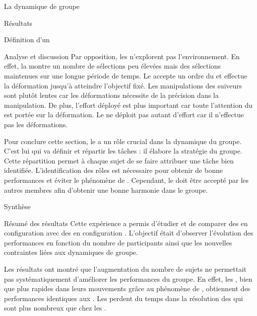 \documentclass[myfrancais,ngerman,english,frenchb]{mythesis}
\begin{document}
\begin{mychapter}{La dynamique de groupe}
\begin{mysection}{Résultats}
\begin{mysubsection}{Définition d'un }
\begin{mysubsubsection}{Analyse et discussion}
					Par opposition, les  n'explorent pas l'environnement.
					En effet, la  montre un nombre de sélections peu élevées mais des sélections maintenues sur une longue période de temps.
					Le  accepte un ordre du  et effectue la déformation jusqu'à atteindre l'objectif fixé.
					Les manipulations des suiveurs sont plutôt lentes car les déformations nécessite de la précision dans la manipulation.
					De plus, l'effort déployé est plus important car toute l'attention du  est portée sur la déformation.
					Le  ne déploit pas autant d'effort car il n'effectue pas les déformations.

					Pour conclure cette section, le  a un rôle crucial dans la dynamique du groupe.
					C'est lui qui va définir et répartir les tâches : il élabore la stratégie du groupe.
					Cette répartition permet à chaque sujet de se faire attribuer une tâche bien identifiée.
					L'identification des rôles est nécessaire pour obtenir de bonne performances et éviter le phénomène de  .
					Cependant, le  doit être accepté par les autres membres afin d'obtenir une bonne harmonie dans le groupe.
				\end{mysubsubsection}
			\end{mysubsection}
		\end{mysection}
		\begin{mysection}{Synthèse}
			\begin{mysubsection}{Résumé des résultats}
				Cette expérience a permis d'étudier et de comparer des  en configuration  avec des  en configuration .
				L'objectif était d'observer l'évolution des performances en fonction du nombre de participants ainsi que les nouvelles contraintes liées aux dynamiques de groupe.

				Les résultats ont montré que l'augmentation du nombre de sujets ne permettait pas systématiquement d'améliorer les performances du groupe.
				En effet, les , bien que plus rapides dans leurs mouvements grâce au phénomène de , obtiennent des performances identiques aux .
				Les  perdent du temps dans la résolution des  qui sont plus nombreux que chez les .


\end{mysubsection}
\end{mysection}
\end{mychapter}
\end{document}
